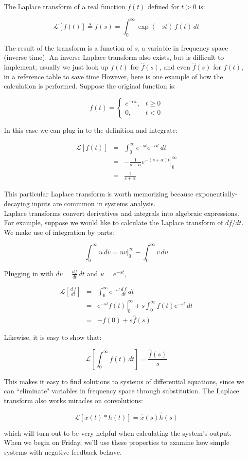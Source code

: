 \documentclass{article}
\newcommand{\Lapl}{\mathscr{L}}
\begin{document}
The Laplace transform of a real function $f(t)$ defined for $t > 0$ is:

\[ \Lapl \left[ f(t) \right] \triangleq \hat{f}(s) = \int_0^{\infty} \exp \left(-st \right) \, f(t) \, dt\]

The result of the transform is a function of $s$, a variable in frequency space (inverse time).  An inverse Laplace transform also exists, but is difficult to implement; usually we just look up $f(t)$ for $\hat{f}(s)$, and even $\hat{f}(s)$ for $f(t)$, in a reference table to save time However, here is one example of how the calculation is performed. Suppose the original function is:

\[  f(t)=\begin{cases}
    e^{- \alpha t}, & t \geq 0\\
    0, & t < 0
  \end{cases} \]

In this case we can plug in to the definition and integrate:

\begin{eqnarray*}
\Lapl \left[ f(t) \right]  & = & \int_0^{\infty} e^{-s t} e^{- \alpha t}\, dt\\
& = & - \frac{1}{s + \alpha} \left.  e^{-(s + \alpha)t} \right|_0^{\infty}\\
& = &  \frac{1}{s + \alpha}
\end{eqnarray*}

This particular Laplace transform is worth memorizing because exponentially-decaying inputs are commmon in systems analysis.\\

Laplace transforms convert derivatives and integrals into algebraic expressions. For example, suppose we would like to calculate the Laplace transform of $df/dt$. We make use of integration by parts:

\[ \int_0^{\infty} u \, dv = \left. uv \right|_0^{\infty} - \int_0^{\infty} v \, du \]

Plugging in with  $dv = \frac{df}{dt} \, dt$ and $u = e^{-st}$,

\begin{eqnarray*}
\Lapl \left[ \frac{d\, f}{dt} \right]  & = & \int_0^{\infty} e^{-s t} \frac{d\, f}{dt} \, dt\\
& = & \left. e^{-s t} f(t) \right|_0^{\infty} + s \int_0^{\infty} f(t) e^{-st} \, dt\\
& = &  -f(0) + s \hat{f}(s)
\end{eqnarray*}

Likewise, it is easy to show that:

\[ \Lapl \left[ \int_0^{\infty} f(t) \, dt \right] = \frac{\hat{f}(s)}{s} \]

This makes it easy to find solutions to systems of differential equations, since we can ``eliminate" variables in frequency space through substitution. The Laplace transform also works miracles on convolutions:

\[ \Lapl \left[x(t) \ast h(t) \right] = \hat{x}(s) \hat{h}(s) \]

which will turn out to be very helpful when calculating the system's output. When we begin on Friday, we'll use these properties to examine how simple systems with negative feedback behave.
\end{document}

